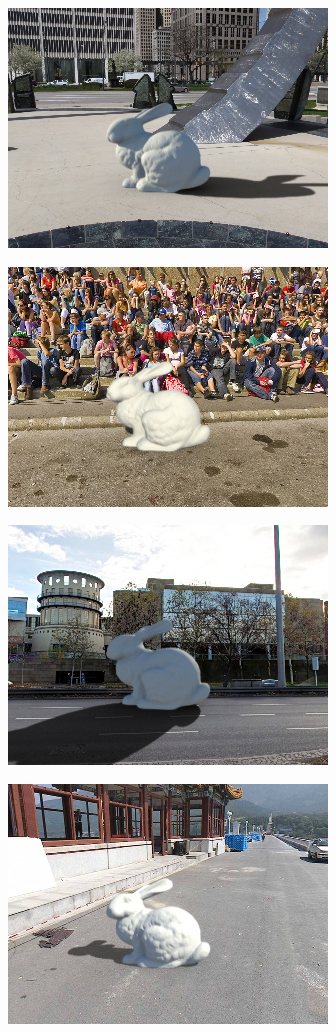 \begin{multicols}{3}
\includegraphics[width=\mywidth]{pano_anfgcccjlbzzhv.jpg}

\includegraphics[width=\mywidth]{pano_aotlotniqjfhrm.jpg}

\includegraphics[width=\mywidth]{pano_aptzailmnatdvm.jpg}

\includegraphics[width=\mywidth]{pano_aqiyqsmecvspfu.jpg}

\end{multicols}


